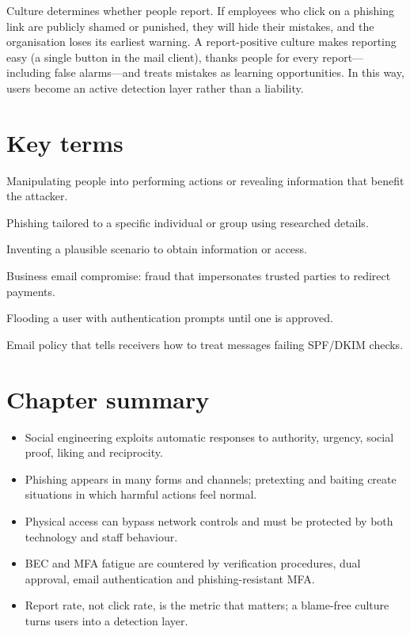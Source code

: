 \documentclass[11pt,openany]{book}
\begin{document}
Culture determines whether people report. If employees who click on a phishing link are publicly shamed or punished, they will hide their mistakes, and the organisation loses its earliest warning. A report-positive culture makes reporting easy (a single button in the mail client), thanks people for every report—including false alarms—and treats mistakes as learning opportunities. In this way, users become an active detection layer rather than a liability.

\section*{Key terms}
\begin{description}[style=nextline,leftmargin=1.2em]
  \item[Social engineering] Manipulating people into performing actions or revealing information that benefit the attacker.
  \item[Spear-phishing] Phishing tailored to a specific individual or group using researched details.
  \item[Pretexting] Inventing a plausible scenario to obtain information or access.
  \item[BEC] Business email compromise: fraud that impersonates trusted parties to redirect payments.
  \item[MFA fatigue] Flooding a user with authentication prompts until one is approved.
  \item[DMARC] Email policy that tells receivers how to treat messages failing SPF/DKIM checks.
\end{description}

\section*{Chapter summary}
\begin{itemize}
  \item Social engineering exploits automatic responses to authority, urgency, social proof, liking and reciprocity.
  \item Phishing appears in many forms and channels; pretexting and baiting create situations in which harmful actions feel normal.
  \item Physical access can bypass network controls and must be protected by both technology and staff behaviour.
  \item BEC and MFA fatigue are countered by verification procedures, dual approval, email authentication and phishing-resistant MFA.
  \item Report rate, not click rate, is the metric that matters; a blame-free culture turns users into a detection layer.
\end{itemize}
\end{document}
